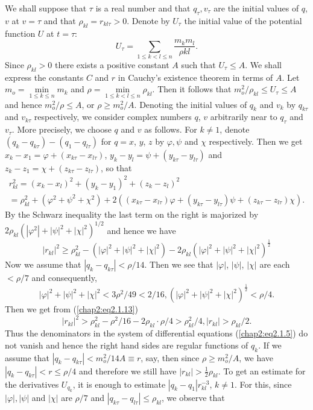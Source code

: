 We shall suppose that $\tau$ is a real number and that $q_\tau, v_\tau$ are the initial values of $q$, $v$ at $v = \tau$ and that $\rho_{kl} = r_{kl\tau} > 0$. Denote by $U_{\tau}$ the initial value of the potential function $U$ at $t=\tau$:
$$
U_\tau = \sum\limits_{1\leq k < l \leq n} \frac{m_k m_l}{\rho kl}. 
$$
Since $\rho_{kl} >0$ there exists a positive constant $A$ such that $U_\tau \leq A$. We shall express the constants $C$ and $r$ in Cauchy's existence theorem in terms of $A$. Let $m_o = \min\limits_{1\leq k \leq n} m_k$ and $\rho = \min\limits_{1 \leq k < l \leq n} \rho_{kl}$. Then it follows that $m^2_o/ \rho_{kl} \leq U_\tau \leq A$ and hence $m^2_o / \rho \leq A$, or $\rho \geq m^2_o/A$. Denoting the initial values of $q_k$ and $v_k$ by $q_{k\tau}$ and $v_{k\tau}$ respectively, we consider complex numbers $q$, $v$ arbitrarily near to $q_\tau$ and $v_\tau$. More precisely, we choose $q$ and $v$ as follows. For $k\neq 1$, denote $(q_k - q_{k\tau}) - (q_1 - q_{l\tau})$ for $q = x$, $y$, $z$ by $\varphi, \psi$ and $\chi$ respectively. Then we get $x_k - x_1 = \varphi + (x_{k\tau} - x_{l\tau})$, $y_k - y_l = \psi + (y_{k\tau} - y_{l\tau})$ and $z_k - z_1 = \chi + (z_{k\tau} - z_{l\tau})$, so that 
\begin{gather*}
r^2_{kl} = (x_k - x_l)^2 + (y_k - y_1)^2 + (z_k - z_l)^2\\
= \rho^2_{kl} + (\varphi^2 + \psi^2 + \chi^2) + 2 ((x_{k\tau} - x_{l\tau}) \varphi + (y_{k\tau}  -y_{l\tau})\psi + (z_{k\tau} - z_{l\tau})\chi).
\end{gather*}
By the Schwarz inequality the last term on the right is majorized by $2\rho_{kl} (|\varphi^2| + |\psi|^2 + |\chi|^2)^{1/2}$ and hence we have 
\begin{equation*}
|r_{kl}|^2 \geq \rho^2_{kl} - (|\varphi|^2 + |\psi|^2 + |\chi|^2) -2 \rho_{kl} (|\varphi|^2 + |\psi|^2 + |\chi|^2)^{\frac{1}{2}} \tag{2.1.13}\label{chap2:eq2.1.13} 
\end{equation*}\pageoriginale
Now we assume that $|q_k - q_{k\tau}| < \rho/14$. Then we see that $|\varphi|$, $|\psi|$, $|\chi|$ are each $< \rho/7$ and consequently,
$$
|\varphi|^2 + |\psi|^2 + |\chi|^2 < 3 \rho^2 / 49 < 2/16, (|\varphi|^2  + |\psi|^2 + |\chi|^2 )^{\frac{1}{2}} < \rho/ 4. 
$$
Then we get from  (\ref{chap2:eq2.1.13})
$$
|r_{kl}|^2 > \rho^2_{kl} - \rho^2 / 16 - 2 \rho_{kl} \cdot \rho/ 4 > \rho^2_{kl} / 4, |r_{kl}| > \rho_{kl}/2.
$$
Thus the denominators in the system of differential equations (\ref{chap2:eq2.1.5}) do not vanish and hence the right hand sides are regular functions of $q_k$. If we assume that $|q_k - q_{k\tau}| < m^2_o / 14A \equiv r$, say, then since $\rho \geq m^2_o/A$, we have $|q_k - q_{k\tau}| < r \leq \rho/4$ and therefore we still have $|r_{kl}| >\frac{1}{2} \rho_{kl}$. To get an estimate for the derivatives $U_{q_k}$, it is enough to estimate $|q_k - q_1|r^{-3}_{kl}$, $k \neq 1$. For this, since $|\varphi|, |\psi|$ and $|\chi|$ are $\rho/7$ and $|q_{k\tau} - q_{l\tau}| \leq \rho_{kl}$, we observe that
